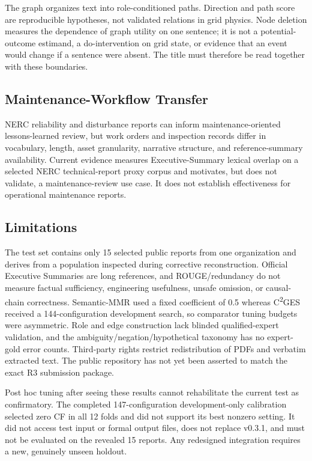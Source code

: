 \documentclass[applsci,article,submit,moreauthors]{Definitions/mdpi}
\newcommand{\cges}{C\textsuperscript{2}GES}
\begin{document}
The graph organizes text into role-conditioned paths. Direction and path score are reproducible hypotheses, not validated relations in grid physics. Node deletion measures the dependence of graph utility on one sentence; it is not a potential-outcome estimand, a do-intervention on grid state, or evidence that an event would change if a sentence were absent. The title must therefore be read together with these boundaries.

\subsection{Maintenance-Workflow Transfer}

NERC reliability and disturbance reports can inform maintenance-oriented lessons-learned review, but work orders and inspection records differ in vocabulary, length, asset granularity, narrative structure, and reference-summary availability. Current evidence measures Executive-Summary lexical overlap on a selected NERC technical-report proxy corpus and motivates, but does not validate, a maintenance-review use case. It does not establish effectiveness for operational maintenance reports.

\subsection{Limitations}

The test set contains only 15 selected public reports from one organization and derives from a population inspected during corrective reconstruction. Official Executive Summaries are long references, and ROUGE/redundancy do not measure factual sufficiency, engineering usefulness, unsafe omission, or causal-chain correctness. Semantic-MMR used a fixed coefficient of 0.5 whereas \cges{} received a 144-configuration development search, so comparator tuning budgets were asymmetric. Role and edge construction lack blinded qualified-expert validation, and the ambiguity/negation/hypothetical taxonomy has no expert-gold error counts. Third-party rights restrict redistribution of PDFs and verbatim extracted text. The public repository has not yet been asserted to match the exact R3 submission package.

Post hoc tuning after seeing these results cannot rehabilitate the current test as confirmatory. The completed 147-configuration development-only calibration selected zero CF in all 12 folds and did not support its best nonzero setting. It did not access test input or formal output files, does not replace v0.3.1, and must not be evaluated on the revealed 15 reports. Any redesigned integration requires a new, genuinely unseen holdout.
\end{document}
